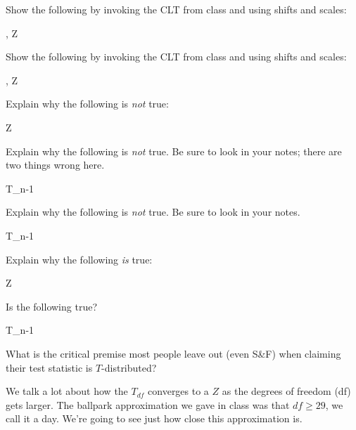 \documentclass[12pt]{article}
\begin{document}
\benum
\easysubproblem Show the following by invoking the CLT from class and using shifts and scales:

\beqn
\Xoneton \iid {}, \quad {} \convd Z
\eeqn

\easysubproblem Show the following by invoking the CLT from class and using shifts and scales:

\beqn
\Xoneton \iid {}, \quad {} \convd Z
\eeqn

\easysubproblem Explain why the following is \textit{not} true:

\beqn
\Xoneton \iid {} \mathimplies {} \equalsindist Z
\eeqn

\intermediatesubproblem Explain why the following is \textit{not} true. Be sure to look in your notes; there are two things wrong here.

\beqn
\Xoneton \iid {} \mathimplies {} \equalsindist T_{n-1}
\eeqn

\intermediatesubproblem Explain why the following is \textit{not} true. Be sure to look in your notes.

\beqn
\Xoneton \iid {} \mathimplies {} \equalsindist T_{n-1}
\eeqn

\hardsubproblem Explain why the following \textit{is} true:

\beqn
\Xoneton \iid \normnot{\mu}{\sigsq} \mathimplies {} \equalsindist Z
\eeqn

\easysubproblem Is the following true?

\beqn
\Xoneton \iid \normnot{\mu}{\sigsq} \mathimplies {} \equalsindist T_{n-1}
\eeqn

What is the critical premise most people leave out (even S\&F) when claiming their test statistic is $T$-distributed?
\eenum

\problem We talk a lot about how the $T_{df}$ converges to a $Z$ as the degrees of freedom (df) gets larger. The ballpark approximation we gave in class was that $df \geq 29$, we call it a day. We're going to see just how close this approximation is.
\end{document}
